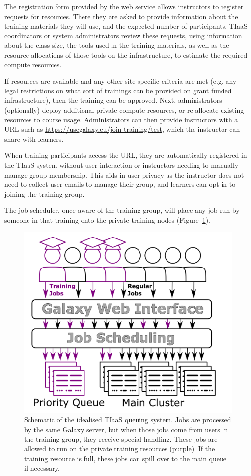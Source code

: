 \documentclass[a4paper,num-refs]{oup-contemporary}
\begin{document}
The registration form provided by the web service allows instructors to register requests for resources. There they are asked to provide information about the training materials they will use, and the expected number of participants. TIaaS coordinators or system administrators review these requests, using information about the class size, the tools used in the training materials, as well as the resource allocations of those tools on the infrastructure, to estimate the required compute resources.

If resources are available and any other site-specific criteria are met (e.g. any legal restrictions on what sort of trainings can be provided on grant funded infrastructure), then the training can be approved. Next, administrators (optionally) deploy additional private compute resources, or re-allocate existing resources to course usage. Administrators can then provide instructors with a URL such as \url{https://usegalaxy.eu/join-training/test}, which the instructor can share with learners.

When training participants access the URL, they are automatically registered in the TIaaS system without user interaction or instructors needing to manually manage group membership. This aids in user privacy as the instructor does not need to collect user emails to manage their group, and learners can opt-in to joining the training group.

The job scheduler, once aware of the training group, will place any job run by someone in that training onto the private training nodes (Figure~\ref{figure:queue}).

\begin{figure}[bt!]
\centering
\includegraphics[width=\linewidth]{images/rules.png}
\caption{Schematic of the idealised TIaaS queuing system. Jobs are processed by the same Galaxy server, but when those jobs come from users in the training group, they receive special handling. These jobs are allowed to run on the private training resources (purple). If the training resource is full, these jobs can spill over to the main queue if necessary.}\label{figure:queue}
\end{figure}
\end{document}

